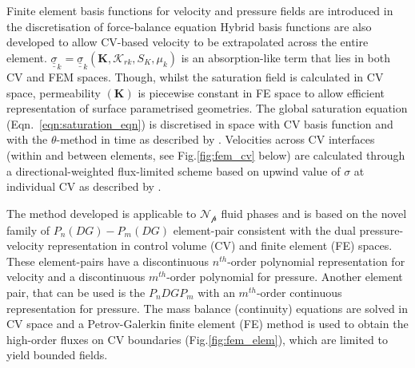 \documentclass[preprint,authoryear,12pt]{elsarticle}
\begin{document}
\medskip
Finite element basis functions for velocity and pressure fields are introduced in the discretisation of force-balance equation %
Hybrid basis functions are also developed to allow CV-based velocity to be extrapolated across the entire element. $\underline{\underline{\sigma}}_{k}=\underline{\underline{\sigma}}_{k}\left({\mathbf K}, \mathcal{K}_{rk}, S_{K}, \mu_{k}\right)$ is an absorption-like term that lies in both CV and FEM spaces. Though, whilst the saturation field is calculated in CV space, permeability $\left({\mathbf K}\right)$ is piecewise constant in FE space to allow efficient representation of surface parametrised geometries. The global saturation equation (Eqn.~\ref{eqn:saturation_eqn}) is discretised in space with CV basis function and with the $\theta$-method in time as described by \citet{gomes_book_2012}. Velocities across CV interfaces (within and between elements, see Fig.\ref{fig:fem_cv} below) are calculated through a directional-weighted flux-limited scheme based on upwind value of $\sigma$ at individual CV as described by \citet{jackson_2013}.

 The method developed is applicable to $\mathcal{N_{p}}$ fluid phases and is based on the novel family of $P_{n}(DG)-P_{m}(DG)$ element-pair consistent with the dual pressure-velocity representation in control volume (CV) and finite element (FE) spaces. These element-pairs have a discontinuous $n^{th}$-order polynomial representation for velocity and a discontinuous $m^{th}$-order polynomial for pressure. Another element pair, that can be used is the $P_{n}DGP_{m}$ with an $m^{th}$-order continuous representation for pressure. The mass balance (continuity) equations are solved in CV space and a Petrov-Galerkin finite element (FE) method is used to obtain the high-order fluxes on CV boundaries (Fig.\ref{fig:fem_elem}), which are limited to yield bounded fields.
\end{document}
